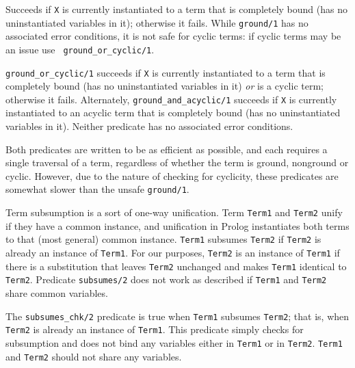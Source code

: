 \begin{description}
%
Succeeds if {\tt X} is currently instantiated to a term that is
completely bound (has no uninstantiated variables in it); otherwise it
fails.  While {\tt ground/1} has no associated error conditions, it is
not safe for cyclic terms: if cyclic terms may be an issue use {\tt
  ground\_or\_cyclic/1}.

%
{\tt ground\_or\_cyclic/1} succeeds if {\tt X} is currently
instantiated to a term that is completely bound (has no uninstantiated
variables in it) {\em or} is a cyclic term; otherwise it fails.
Alternately, {\tt ground\_and\_acyclic/1} succeeds if {\tt X} is
currently instantiated to an acyclic term that is completely bound
(has no uninstantiated variables in it).  Neither predicate has no
associated error conditions.

Both predicates are written to be as efficient as possible, and each
requires a single traversal of a term, regardless of whether the term
is ground, nonground or cyclic.  However, due to the nature of
checking for cyclicity, these predicates are somewhat slower than the
unsafe {\tt ground/1}.

    Term subsumption is a sort of one-way unification.  Term {\tt Term1}
    and {\tt Term2} unify if they have a common instance, and unification
    in Prolog instantiates both terms to that (most general) common instance.
    {\tt Term1} subsumes {\tt Term2} if {\tt Term2} is already an instance of
    {\tt Term1}.  For our purposes, {\tt Term2} is an instance of {\tt Term1}
    if there is a substitution that leaves {\tt Term2} unchanged and makes
    {\tt Term1} identical to {\tt Term2}.  Predicate {\tt subsumes/2} does
    not work as described if {\tt Term1} and {\tt Term2} share common
    variables.

%
%
    The {\tt subsumes\_chk/2} predicate is true when {\tt Term1} subsumes 
    {\tt Term2}; that is, when {\tt Term2} is already an instance of
    {\tt Term1}.  This predicate simply checks for subsumption and 
    does not bind any variables either in {\tt Term1} or in {\tt Term2}.
    {\tt Term1} and {\tt Term2} should not share any variables.


\end{description}
